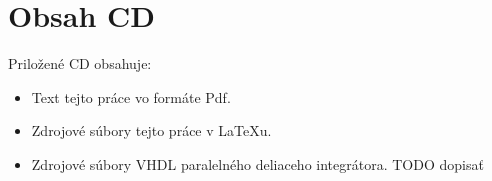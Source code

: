 

\chapter{Obsah CD}

Priložené CD obsahuje:\\
\begin{itemize}
\item Text tejto práce vo formáte Pdf.
\item Zdrojové súbory tejto práce v \LaTeX u.
\item Zdrojové súbory VHDL paralelného deliaceho integrátora.
TODO dopisať
\end{itemize}










